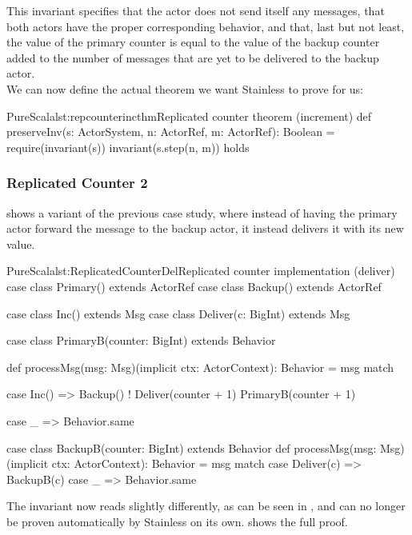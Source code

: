 This invariant specifies that the  actor does not send itself any messages, that both actors have the proper corresponding behavior, and that, last but not least, the value of the primary counter is equal to the value of the backup counter added to the number of messages that are yet to be delivered to the backup actor.\\

We can now define the actual theorem we want Stainless to prove for us:

\begin{Code}{PureScala}{lst:repcounterincthm}{Replicated counter theorem (increment)}
def preserveInv(s: ActorSystem, n: ActorRef, m: ActorRef): Boolean = {
  require(invariant(s))
  invariant(s.step(n, m))
} holds
\end{Code}


\subsubsection*{Replicated Counter 2}

 shows a variant of the previous case study, where instead of having the primary actor forward the  message to the backup actor, it instead delivers it with its new value.

\begin{Code}{PureScala}{lst:ReplicatedCounterDel}{Replicated counter implementation (deliver)}
case class Primary() extends ActorRef
case class Backup()  extends ActorRef

case class Inc() extends Msg
case class Deliver(c: BigInt) extends Msg

case class PrimaryB(counter: BigInt) extends Behavior {
  def processMsg(msg: Msg)(implicit ctx: ActorContext): Behavior = msg match {
    case Inc() =>
      Backup() ! Deliver(counter + 1)
      PrimaryB(counter + 1)

    case _ => Behavior.same
  }
}

case class BackupB(counter: BigInt) extends Behavior {
  def processMsg(msg: Msg)(implicit ctx: ActorContext): Behavior = msg match {
    case Deliver(c) => BackupB(c)
    case _          => Behavior.same
  }
}
\end{Code}

The invariant now reads slightly differently, as can be seen in , and can no longer be proven automatically by Stainless on its own.  shows the full proof.

